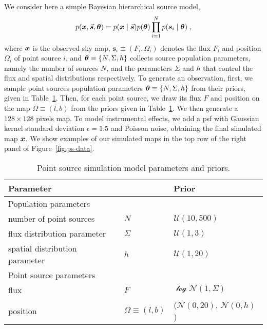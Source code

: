 We consider here a simple Bayesian hierarchical source model,
  \begin{equation} \label{eq:ps-model}
    p(\bm{x}, \vec{\boldsymbol{s}}, \bm{\theta}) = p(\bm{x} \mid  \vec{\boldsymbol{s}}) p(\bm{\theta}) \prod_{i=1}^N p(\boldsymbol{s}_i\mid \bm{\theta})\;,
\end{equation}
where $\bm{x}$ is the observed sky map, $\boldsymbol{s}_i \equiv (F_i, \Omega_i)$ denotes the flux $F_i$ and position $\Omega_i$ of point source $i$, and $\bm{\theta} \equiv \{N, \Sigma, h\}$ collects source population parameters, namely the number of sources $N$, and the parameters $\Sigma$ and $h$ that control the flux and spatial distributions respectively. To generate an observation, first, we sample point sources population parameters $\bm{\theta} \equiv \{N, \Sigma, h\}$ from their priors, given in Table~\ref{tab:ps-model}. Then, for each point source, we draw its flux $F$ and position on the map $\Omega\equiv(l, b)$ from the priors given in Table~\ref{tab:ps-model}. We then generate a $128 \times 128$ pixels map. To model instrumental effects, we add a \gls*{psf} with Gaussian kernel standard deviation $\epsilon=1.5$ and Poisson noise, obtaining the final simulated map $\bm{x}$. We show examples of our simulated maps in the top row of the right panel of Figure~\ref{fig:ps-data}.
  
\begin{table}
  \centering
  \begin{tabular}{l l l }
    \toprule
        Parameter & & Prior \\
    \midrule
        Population parameters & & \\
            \quad number of point sources & $N$ & $\mathcal{U}(10, 500)$ \\
            \quad flux distribution parameter & $\Sigma$ & $\mathcal{U}(1, 3)$ \\
            \quad spatial distribution parameter & $h$ & $\mathcal{U}(1, 20)$ \\
    \midrule
        Point source parameters & & \\
            \quad flux & $F$ & $\mathcal{\log N}(1, \Sigma)$ \\
            \quad position & $\Omega\equiv(l, b)$ & ($\mathcal{N}(0, 20)$, $\mathcal{N}(0, h)$) \\
    \bottomrule
  \end{tabular}
  \caption{Point source simulation model parameters and priors.}
   \label{tab:ps-model}
\end{table}


